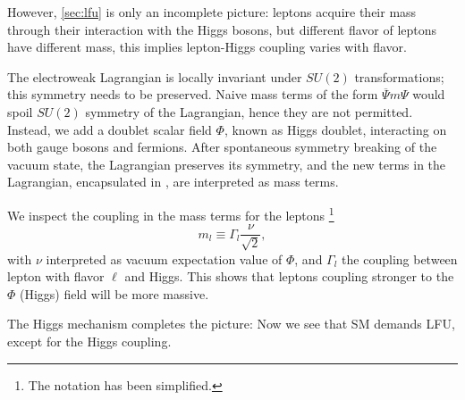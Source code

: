 However, \autoref{sec:lfu} is only an incomplete picture:
leptons acquire their mass through their interaction with the Higgs bosons,
but different flavor of leptons have different mass, this implies lepton-Higgs
coupling varies with flavor.

The electroweak Lagrangian is locally invariant under $SU(2)$ transformations;
this symmetry needs to be preserved.
Naive mass terms of the form $\overline{\Psi} m \Psi$
would spoil $SU(2)$ symmetry of the Lagrangian, hence they are not permitted.
Instead, we add a doublet scalar field $\Phi$, known as Higgs doublet,
interacting on both gauge bosons and fermions.
After spontaneous symmetry breaking of the vacuum state, the Lagrangian
preserves its symmetry, and the new terms in the Lagrangian, encapsulated in
, are interpreted as mass terms.

We inspect the coupling in the mass terms for the
leptons \cite{Langacker:2010zza}\footnote{
    The notation has been simplified.
}
\begin{equation}
    m_l \equiv \Gamma_l \frac{\nu}{\sqrt{2}},
\end{equation}
with $\nu$ interpreted as vacuum expectation value of $\Phi$, and $\Gamma_l$ the
coupling between lepton with flavor $\ell$ and Higgs.
This shows that leptons coupling stronger to the $\Phi$ (Higgs) field will be
more massive.

The Higgs mechanism completes the picture:
Now we see that SM demands LFU, except for the Higgs coupling.
